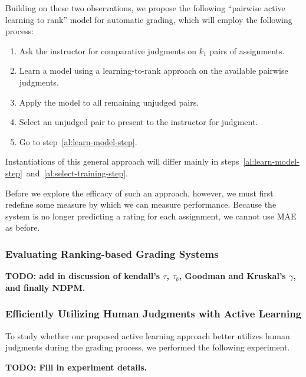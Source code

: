 Building on these two observations, we propose the following ``pairwise
active learning to rank'' model for automatic grading, which will employ
the following process:
\begin{enumerate}
  \item Ask the instructor for comparative judgments on $k_1$ pairs of
    assignments.
  \item Learn a model using a learning-to-rank approach on the available
    pairwise judgments.\label{al:learn-model-step}
  \item Apply the model to all remaining unjudged pairs.
  \item Select an unjudged pair to present to the instructor for judgment.
    \label{al:select-training-step}
  \item Go to step~\ref{al:learn-model-step}.
\end{enumerate}
Instantiations of this general approach will differ mainly in
steps~\ref{al:learn-model-step}~and~\ref{al:select-training-step}.

Before we explore the efficacy of such an approach, however, we must first
redefine some measure by which we can measure performance. Because the
system is no longer predicting a rating for each assignment, we cannot use
MAE as before.

\subsubsection{Evaluating Ranking-based Grading Systems}

\textbf{TODO: add in discussion of kendall's $\tau$, $\tau_b$, Goodman and
Kruskal's $\gamma$, and finally NDPM.}

\subsubsection{Efficiently Utilizing Human Judgments with Active Learning}
To study whether our proposed active learning approach better utilizes
human judgments during the grading process, we performed the following
experiment.

\textbf{TODO: Fill in experiment details.}

